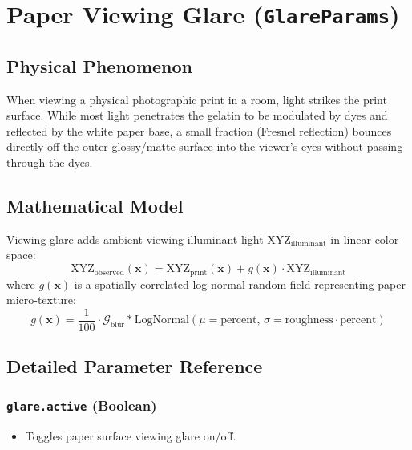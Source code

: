 \documentclass[11pt,a4paper]{article}
\begin{document}
\newpage

\section{Paper Viewing Glare (\texttt{GlareParams})}

\subsection{Physical Phenomenon}
When viewing a physical photographic print in a room, light strikes the print surface. While most light penetrates the gelatin to be modulated by dyes and reflected by the white paper base, a small fraction (Fresnel reflection) bounces directly off the outer glossy/matte surface into the viewer's eyes without passing through the dyes.

\subsection{Mathematical Model}
Viewing glare adds ambient viewing illuminant light $\mathrm{XYZ}_{\text{illuminant}}$ in linear color space:
\begin{equation}
\mathrm{XYZ}_{\text{observed}}(\mathbf{x}) = \mathrm{XYZ}_{\text{print}}(\mathbf{x}) + g(\mathbf{x}) \cdot \mathrm{XYZ}_{\text{illuminant}}
\end{equation}
where $g(\mathbf{x})$ is a spatially correlated log-normal random field representing paper micro-texture:
\begin{equation}
g(\mathbf{x}) = \frac{1}{100} \cdot \mathcal{G}_{\text{blur}} * \mathrm{LogNormal}\left(\mu = \text{percent},\, \sigma = \text{roughness} \cdot \text{percent}\right)
\end{equation}

\subsection{Detailed Parameter Reference}

\subsubsection{\texttt{glare.active} (Boolean)}
\begin{itemize}[leftmargin=*]
    \item Toggles paper surface viewing glare on/off.
\end{itemize}
\end{document}
